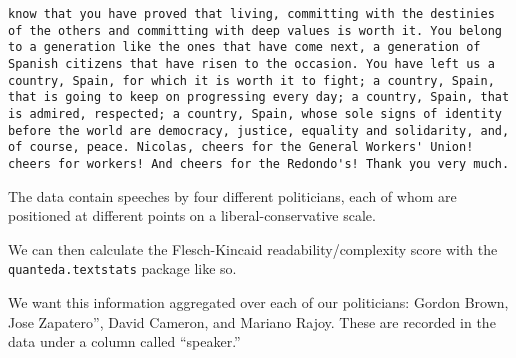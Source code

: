 \documentclass[
]{article}
\newenvironment{Shaded}{\begin{snugshade}}{\end{snugshade}}
\newcommand{\AttributeTok}[1]{\textcolor[rgb]{0.13,0.29,0.53}{#1}}
\newcommand{\CommentTok}[1]{\textcolor[rgb]{0.56,0.35,0.01}{\textit{#1}}}
\newcommand{\FunctionTok}[1]{\textcolor[rgb]{0.13,0.29,0.53}{\textbf{#1}}}
\newcommand{\NormalTok}[1]{#1}
\newcommand{\OtherTok}[1]{\textcolor[rgb]{0.56,0.35,0.01}{#1}}
\newcommand{\SpecialCharTok}[1]{\textcolor[rgb]{0.81,0.36,0.00}{\textbf{#1}}}
\newcommand{\StringTok}[1]{\textcolor[rgb]{0.31,0.60,0.02}{#1}}
\begin{document}
\begin{verbatim}
know that you have proved that living, committing with the destinies of the others and committing with deep values is worth it. You belong to a generation like the ones that have come next, a generation of Spanish citizens that have risen to the occasion. You have left us a country, Spain, for which it is worth it to fight; a country, Spain, that is going to keep on progressing every day; a country, Spain, that is admired, respected; a country, Spain, whose sole signs of identity before the world are democracy, justice, equality and solidarity, and, of course, peace. Nicolas, cheers for the General Workers' Union! cheers for workers! And cheers for the Redondo's! Thank you very much.
\end{verbatim}

The data contain speeches by four different politicians, each of whom
are positioned at different points on a liberal-conservative scale.

We can then calculate the Flesch-Kincaid readability/complexity score
with the \texttt{quanteda.textstats} package like so.

\begin{Shaded}
\end{Shaded}

We want this information aggregated over each of our politicians: Gordon
Brown, Jose Zapatero'', David Cameron, and Mariano Rajoy. These are
recorded in the data under a column called ``speaker.''
\end{document}
